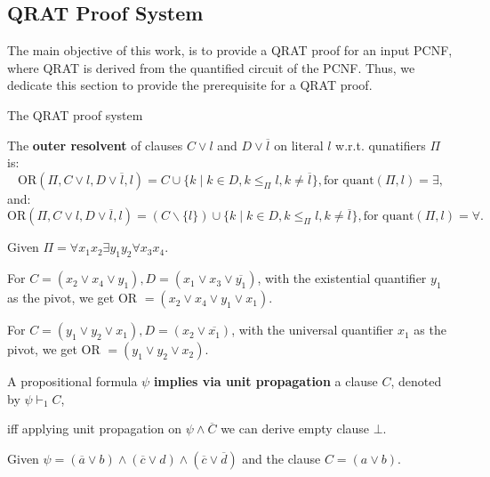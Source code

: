 \subsection{QRAT Proof System}

The main objective of this work, is to provide a QRAT proof for an input PCNF, where QRAT is derived from the quantified circuit of the PCNF. Thus, we dedicate this section to provide the prerequisite for a QRAT proof.

The QRAT proof system 

\begin{definition}
    The \textbf{outer resolvent} of clauses $C \lor l$ and $D \lor \overline{l}$ on literal $l$ w.r.t. qunatifiers $\Pi$ is:
    \[ \text{OR}(\Pi, C \lor l, D \lor \overline{l}, l) = C \cup \{k \mid k \in D, k \leq_\Pi l, k \not= \overline{l}\}, \text{for quant}(\Pi, l) = \exists,  \]
    and:
    \[ \text{OR}(\Pi, C \lor l, D \lor \overline{l}, l) = (C \backslash \{l\}) \cup \{k \mid k \in D, k \leq_\Pi l, k \not= \overline{l}\}, \text{for quant}(\Pi, l) = \forall.  \]

\end{definition}

\begin{example}
    Given $\Pi = \forall x_1 x_2 \exists y_1y_2 \forall x_3 x_4$.
    
    For $C = (x_2 \lor x_4 \lor y_1), D = (x_1 \lor x_3 \lor \overline{y_1})$, with the existential quantifier $y_1$ as the pivot, we get OR $=(x_2 \lor x_4 \lor y_1 \lor x_1)$.

    For $C = (y_1 \lor y_2 \lor x_1), D = (x_2 \lor \overline{x_1})$, with the universal quantifier $x_1$ as the pivot, we get OR $=(y_1 \lor y_2 \lor x_2)$.
\end{example}

\begin{definition}
    A propositional formula $\psi$ \textbf{implies via unit propagation} a clause $C$, denoted by $\psi \vdash_1 C$, 
    
    iff applying unit propagation on $\psi \land \overline{C}$ we can derive empty clause $\bot$. 
\end{definition}

\begin{example}
    Given $\psi = (\overline{a} \lor b) \land (\overline{c} \lor d) \land (\overline{c} \lor \overline{d})$ and the clause $C = (a \lor b)$. 
\end{example}

